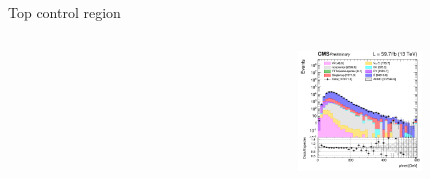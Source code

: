 \documentclass[8pt]{beamer}
\begin{document}
\begin{frame}{Top control region}
\begin{columns}
\begin{column}{0.33\textwidth}
		\end{column}
		\begin{column}{0.33\textwidth}
			\begin{center}
     			\includegraphics[width=1.0\textwidth, height=90pt]{figs/2018/log_cratio_ttbarCR_ll_METcorrected_pt.png}
    		\end{center}		
		\end{column}
\end{columns} \vfill
\end{frame}
\end{document}
